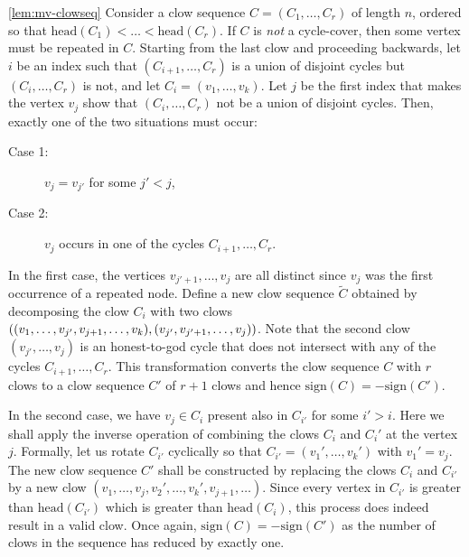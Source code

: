 \begin{proofof}{\autoref{lem:mv-clowseq}}
Consider a clow sequence $C = (C_1,\dots, C_r)$ of length $n$, ordered so that $\mathrm{head}(C_1) < \dots < \mathrm{head}(C_r)$. 
If $C$ is \emph{not} a cycle-cover, then some vertex must be repeated in $C$. 
Starting from the last clow and proceeding backwards, let $i$ be an index such that $(C_{i+1},\dots, C_{r})$ is a union of disjoint cycles but $(C_{i},\dots, C_r)$ is not, and let $C_i = (v_1,\dots, v_k)$. 
Let $j$ be the first index that makes the vertex $v_{j}$ show that $(C_i,\dots, C_r)$ not be a union of disjoint cycles. 
Then, exactly one of the two situations must occur:
\begin{description}
 \item[Case 1:] $v_{j} = v_{j'}$ for some $j' < j$,

 \item[Case 2:] $v_{j}$ occurs in one of the cycles $C_{i+1},\dots, C_r$. 
\end{description}

In the first case, the vertices $v_{j'+1},\dots, v_{j}$ are all distinct since $v_j$ was the first occurrence of a repeated node. 
Define a new clow sequence  $\tilde{C}$ obtained by decomposing the clow $C_i$ with two clows $\left((v_1,\dots, v_{j'},v_{j+1},\dots, v_k), (v_{j'},v_{j'+1},\dots,v_{j})\right)$. 
Note that the second clow $(v_{j'},\dots, v_j)$ is an honest-to-god cycle that does not intersect with any of the cycles $C_{i+1},\dots, C_r$. 
This transformation converts the clow sequence $C$ with $r$ clows to a clow sequence $C'$ of $r+1$ clows and hence $\mathrm{sign}(C) = - \mathrm{sign}(C')$. 

In the second case, we have $v_j \in C_i$ present also in $C_{i'}$ for some $i' > i$. 
Here we shall apply the inverse operation of combining the clows $C_i$ and $C_i'$ at the vertex $j$. 
Formally, let us rotate $C_{i'}$ cyclically so that $C_{i'} = (v_1',\dots, v_k')$ with $v_1' = v_j$. 
The new clow sequence $C'$ shall be constructed by replacing the clows $C_i$ and $C_{i'}$ by a new clow $(v_1,\dots, v_j, v_2',\dots, v_k', v_{j+1},\dots)$. 
Since every vertex in $C_{i'}$ is greater than $\mathrm{head}(C_{i'})$ which is greater than $\mathrm{head}(C_i)$, this process does indeed result in a valid clow. 
Once again, $\mathrm{sign}(C) = - \mathrm{sign}(C')$ as the number of clows in the sequence has reduced by exactly one.\\

\end{proofof}
